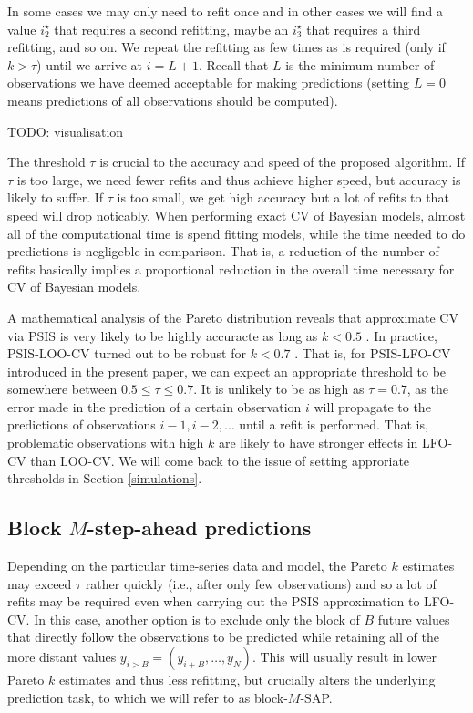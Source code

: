 \documentclass[american,]{article}
\begin{document}
In some cases we may only need to refit once and in other cases we will find a
value \(i^\star_2\) that requires a second refitting, maybe an \(i^\star_3\) that
requires a third refitting, and so on. We repeat the refitting as few times as
is required (only if \(k > \tau\)) until we arrive at \(i = L + 1\). Recall that \(L\)
is the minimum number of observations we have deemed acceptable for making
predictions (setting \(L=0\) means predictions of all observations should be
computed).

TODO: visualisation

The threshold \(\tau\) is crucial to the accuracy and speed of the proposed
algorithm. If \(\tau\) is too large, we need fewer refits and thus achieve higher
speed, but accuracy is likely to suffer. If \(\tau\) is too small, we get high
accuracy but a lot of refits to that speed will drop noticably. When performing
exact CV of Bayesian models, almost all of the computational time is spend
fitting models, while the time needed to do predictions is negligeble in
comparison. That is, a reduction of the number of refits basically implies a
proportional reduction in the overall time necessary for CV of Bayesian models.

A mathematical analysis of the Pareto distribution reveals that approximate CV
via PSIS is very likely to be highly accuracte as long as \(k < 0.5\)
\citep{vehtari2017psis}. In practice, PSIS-LOO-CV turned out to be robust for
\(k < 0.7\) \citep{vehtari2017loo}. That is, for PSIS-LFO-CV introduced in the
present paper, we can expect an appropriate threshold to be somewhere between
\(0.5 \leq \tau \leq 0.7\). It is unlikely to be as high as \(\tau = 0.7\), as the
error made in the prediction of a certain observation \(i\) will propagate to the
predictions of observations \(i-1, i-2, \ldots\) until a refit is performed. That
is, problematic observations with high \(k\) are likely to have stronger effects
in LFO-CV than LOO-CV. We will come back to the issue of setting approriate
thresholds in Section \ref{simulations}.

\hypertarget{approximate_blockMSAP}{%
\subsection{\texorpdfstring{Block \(M\)-step-ahead predictions}{Block M-step-ahead predictions}}\label{approximate_blockMSAP}}

Depending on the particular time-series data and model, the Pareto \(k\) estimates
may exceed \(\tau\) rather quickly (i.e., after only few observations) and so
a lot of refits may be required even when carrying out the PSIS approximation
to LFO-CV. In this case, another option is to exclude only the block of \(B\)
future values that directly follow the observations to be predicted while
retaining all of the more distant values \(y_{i>B} = (y_{i + B}, \ldots, y_N)\).
This will usually result in lower Pareto \(k\) estimates and thus less refitting,
but crucially alters the underlying prediction task, to which we will refer
to as block-\(M\)-SAP.
\end{document}
